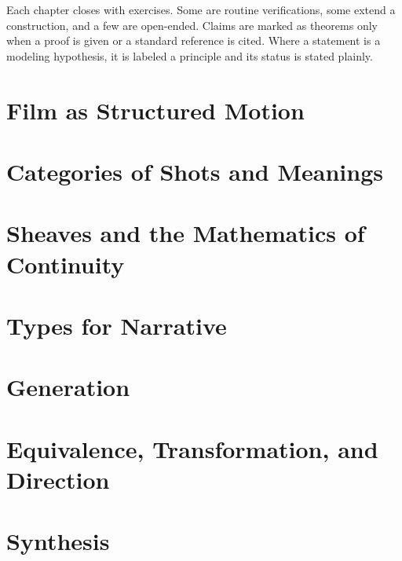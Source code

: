 \documentclass[11pt,twoside,openright]{book}
\theoremstyle{plain}
\theoremstyle{definition}
\theoremstyle{remark}
\begin{document}
Each chapter closes with exercises. Some are routine verifications, some extend a construction, and a few are open-ended. Claims are marked as theorems only when a proof is given or a standard reference is cited. Where a statement is a modeling hypothesis, it is labeled a principle and its status is stated plainly.

\tableofcontents

\mainmatter

\part{Film as Structured Motion}




\part{Categories of Shots and Meanings}



\part{Sheaves and the Mathematics of Continuity}




\part{Types for Narrative}



\part{Generation}




\part{Equivalence, Transformation, and Direction}




\part{Synthesis}



\appendix





\backmatter

\end{document}
